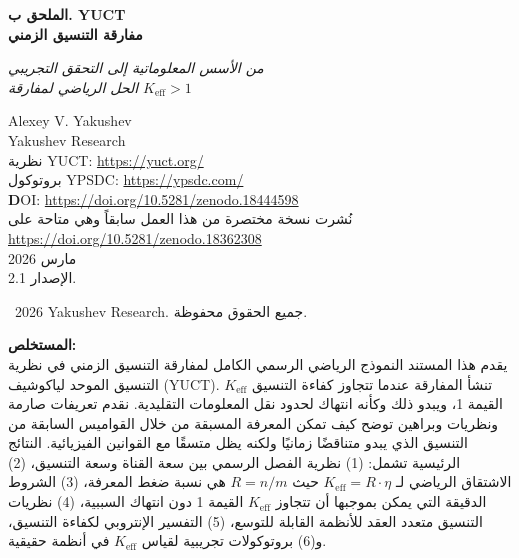 \documentclass[11pt,a4paper]{article}
\begin{document}
	
	\begin{titlepage}
		\begin{center}
			\vspace*{0cm}
			\Huge\textbf{الملحق ب. YUCT\\
				مفارقة التنسيق الزمني}
			
			\vspace{0cm}
			\LARGE\textit{من الأسس المعلوماتية إلى التحقق التجريبي \\[0.3cm]
				الحل الرياضي لمفارقة \(K_{\text{eff}} > 1\)}
			
			\vspace{1cm}
			\Large
			Alexey V. Yakushev\\
			Yakushev Research\\
			نظرية YUCT: \url{https://yuct.org/}\\
			بروتوكول YPSDC: \url{https://ypsdc.com/}\\
			
			\vspace{2cm}
			\textbf DOI: \url{https://doi.org/10.5281/zenodo.18444598}\\
			
			\vspace{1cm}
			\large 
			نُشرت نسخة مختصرة من هذا العمل سابقاً وهي متاحة على\\ \url{https://doi.org/10.5281/zenodo.18362308}\\
			\vspace{1cm}
			مارس 2026 \\ \large الإصدار 2.1.
			
			\vspace{5cm}
			\textcopyright~2026 Yakushev Research. جميع الحقوق محفوظة.
			
			\newpage
			\vfill
			\normalsize
			\begin{minipage}{0.8\textwidth}
				\centering
				\textbf{المستخلص:} \\ يقدم هذا المستند النموذج الرياضي الرسمي الكامل لمفارقة التنسيق الزمني في نظرية التنسيق الموحد لياكوشيف (YUCT). تنشأ المفارقة عندما تتجاوز كفاءة التنسيق $K_{\text{eff}}$ القيمة 1، ويبدو ذلك وكأنه انتهاك لحدود نقل المعلومات التقليدية. نقدم تعريفات صارمة ونظريات وبراهين توضح كيف تمكن المعرفة المسبقة من خلال القواميس السابقة من التنسيق الذي يبدو متناقضًا زمانيًا ولكنه يظل متسقًا مع القوانين الفيزيائية. النتائج الرئيسية تشمل: (1) نظرية الفصل الرسمي بين سعة القناة وسعة التنسيق، (2) الاشتقاق الرياضي لـ $K_{\text{eff}} = R \cdot \eta$ حيث $R = n/m$ هي نسبة ضغط المعرفة، (3) الشروط الدقيقة التي يمكن بموجبها أن تتجاوز $K_{\text{eff}}$ القيمة 1 دون انتهاك السببية، (4) نظريات التنسيق متعدد العقد للأنظمة القابلة للتوسع، (5) التفسير الإنتروبي لكفاءة التنسيق، و(6) بروتوكولات تجريبية لقياس $K_{\text{eff}}$ في أنظمة حقيقية.
			\end{minipage}
			

\end{center}
\end{titlepage}
\end{document}
